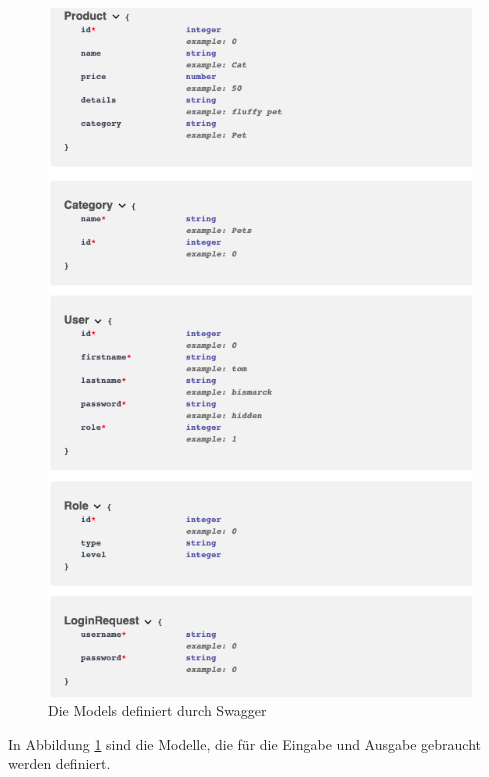 \documentclass[
               letterpaper,%
               10pt,%
               oneside,%
               onecolumn,%
               final,%
               openany%
              ]{report}
\begin{document}
\begin{figure}[h!]
\includegraphics[scale=0.5]{schema2}
\caption{Die Models definiert durch Swagger}
\label{fig:schema2}
\centering
\end{figure}
In Abbildung \ref{fig:schema2} sind die Modelle, die für die Eingabe und Ausgabe gebraucht werden definiert.
\end{document}
